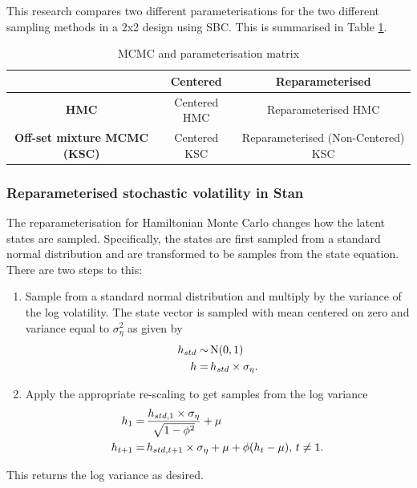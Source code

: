 \documentclass[12pt, a4paper]{article}
\begin{document}
        This research compares two different parameterisations for the two different sampling methods in a 2x2 design using SBC. This is summarised in Table \ref{tab:params}.
        \begin{table}
            \centering
            \begin{tabular}{|c|c|c|} \hline 
                 &  \textbf{Centered}& \textbf{Reparameterised}\\ \hline 
                 \textbf{HMC}&  Centered HMC& Reparameterised HMC\\ \hline 
                 \textbf{Off-set mixture MCMC (KSC)}&  Centered KSC& Reparameterised (Non-Centered) KSC\\ \hline
            \end{tabular}
            \caption{MCMC and parameterisation matrix}
            \label{tab:params}
        \end{table}
        
        \subsubsection{Reparameterised stochastic volatility in Stan}
        The reparameterisation for Hamiltonian Monte Carlo changes how the latent states are sampled. Specifically, the states are first sampled from a standard normal distribution and are transformed to be samples from the state equation. There are two steps to this:
        \begin{enumerate}
            
        \item Sample from a standard normal distribution and multiply by the variance of the log volatility. The state vector is sampled with mean centered on zero and variance equal to $\sigma_{\eta}^2$ as given by
        \begin{align}
        h_{std} \sim&\space \,\mathrm{N}(0,1) \\
        h =& \space \, h_{std} \times \sigma_{\eta}.
        \end{align}
        \item Apply the appropriate re-scaling to get samples from the log variance
        \begin{align}
        h_1 =& \space \,\frac{h_{std, 1}\times \sigma_{\eta}} {\sqrt{1 - \phi^2}} + \mu \\
        h_{t+1} =& \space \,h_{std, t+1}\times \sigma_{\eta} + \mu  + \phi(h_{t} - \mu),\space \, t\neq 1.
        \end{align}
        \end{enumerate}
        This returns the log variance as desired.
        
\end{document}
